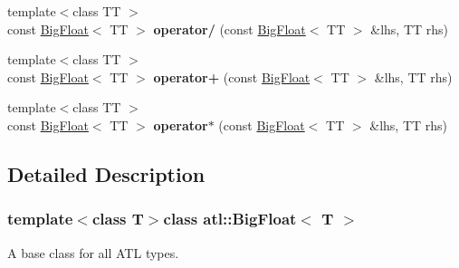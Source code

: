 \begin{DoxyCompactItemize}
\item 
\hypertarget{classatl_1_1_big_float_a05f183853ddbc79f675c2ae1a1b76773}{{\footnotesize template$<$class T\+T $>$ }\\const \hyperlink{classatl_1_1_big_float}{Big\+Float}$<$ T\+T $>$ {\bfseries operator/} (const \hyperlink{classatl_1_1_big_float}{Big\+Float}$<$ T\+T $>$ \&lhs, T\+T rhs)}\label{classatl_1_1_big_float_a05f183853ddbc79f675c2ae1a1b76773}

\item 
\hypertarget{classatl_1_1_big_float_a22d4fefe84e9bc432e104b911480abfa}{{\footnotesize template$<$class T\+T $>$ }\\const \hyperlink{classatl_1_1_big_float}{Big\+Float}$<$ T\+T $>$ {\bfseries operator+} (const \hyperlink{classatl_1_1_big_float}{Big\+Float}$<$ T\+T $>$ \&lhs, T\+T rhs)}\label{classatl_1_1_big_float_a22d4fefe84e9bc432e104b911480abfa}

\item 
\hypertarget{classatl_1_1_big_float_a3e919a089b3c45ce5fdb96abd162c03b}{{\footnotesize template$<$class T\+T $>$ }\\const \hyperlink{classatl_1_1_big_float}{Big\+Float}$<$ T\+T $>$ {\bfseries operator$\ast$} (const \hyperlink{classatl_1_1_big_float}{Big\+Float}$<$ T\+T $>$ \&lhs, T\+T rhs)}\label{classatl_1_1_big_float_a3e919a089b3c45ce5fdb96abd162c03b}

\end{DoxyCompactItemize}


\subsection{Detailed Description}
\subsubsection*{template$<$class T$>$class atl\+::\+Big\+Float$<$ T $>$}

A base class for all A\+T\+L types. 

